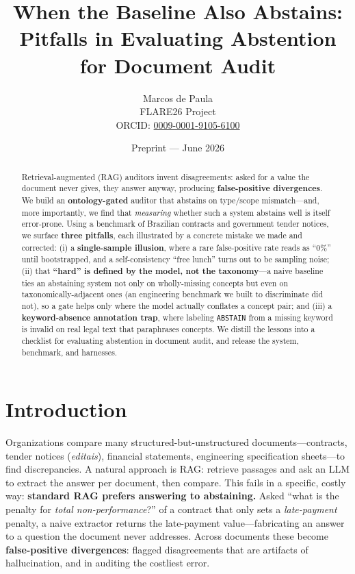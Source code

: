 \documentclass[11pt]{article}
\title{When the Baseline Also Abstains:\\
Pitfalls in Evaluating Abstention for Document Audit}
\author{Marcos de Paula \\ FLARE26 Project \\
\small ORCID: \href{https://orcid.org/0009-0001-9105-6100}{0009-0001-9105-6100}}
\date{Preprint --- June 2026}
\begin{document}
\maketitle

\begin{abstract}
Retrieval-augmented (RAG) auditors invent disagreements: asked for a value the
document never gives, they answer anyway, producing \textbf{false-positive
divergences}. We build an \textbf{ontology-gated} auditor that abstains on
type/scope mismatch---and, more importantly, we find that \emph{measuring}
whether such a system abstains well is itself error-prone. Using a benchmark of
Brazilian contracts and government tender notices, we surface \textbf{three
pitfalls}, each illustrated by a concrete mistake we made and corrected: (i) a
\textbf{single-sample illusion}, where a rare false-positive rate reads as
``0\%'' until bootstrapped, and a self-consistency ``free lunch'' turns out to be
sampling noise; (ii) that \textbf{``hard'' is defined by the model, not the
taxonomy}---a naive baseline ties an abstaining system not only on wholly-missing
concepts but even on taxonomically-adjacent ones (an engineering benchmark we
built to discriminate did not), so a gate helps only where the model actually
conflates a concept pair; and (iii) a \textbf{keyword-absence annotation trap},
where labeling \texttt{ABSTAIN} from a missing keyword is invalid on real legal
text that paraphrases concepts. We distill the lessons into a checklist for
evaluating abstention in document audit, and release the system, benchmark, and
harnesses.
\end{abstract}

\section{Introduction}
Organizations compare many structured-but-unstructured documents---contracts,
tender notices (\emph{editais}), financial statements, engineering specification
sheets---to find discrepancies. A
natural approach is RAG: retrieve passages and ask an LLM to extract the answer
per document, then compare. This fails in a specific, costly way:
\textbf{standard RAG prefers answering to abstaining.} Asked ``what is the
penalty for \emph{total non-performance}?'' of a contract that only sets a
\emph{late-payment} penalty, a naive extractor returns the late-payment
value---fabricating an answer to a question the document never addresses. Across
documents these become \textbf{false-positive divergences}: flagged
disagreements that are artifacts of hallucination, and in auditing the costliest
error.
\end{document}

